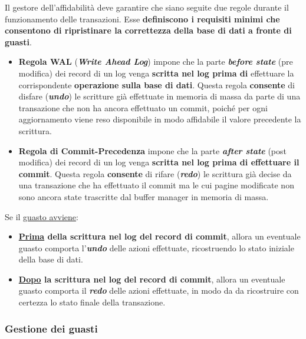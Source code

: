 \documentclass[a4paper]{article}
\begin{document}
	Il gestore dell'affidabilità deve garantire che siano seguite due regole durante il funzionamento delle transazioni. Esse \textbf{definiscono i requisiti minimi che consentono di ripristinare la correttezza della base di dati a fronte di guasti}.
	\begin{itemize}
		\item \textcolor{Red3}{\textbf{Regola WAL}} (\textbf{\emph{Write Ahead Log}}) impone che la parte \textbf{\emph{before state}} (pre modifica) dei record di un log venga \textbf{scritta nel log prima di} effettuare la corrispondente \textbf{operazione sulla base di dati}.\newline
		Questa regola \textbf{consente} di disfare (\textbf{\emph{undo}}) le scritture già effettuate in memoria di massa da parte di una transazione che non ha ancora effettuato un commit, poiché per ogni aggiornamento viene reso disponibile in modo affidabile il valore precedente la scrittura.
		
		\item \textcolor{Red3}{\textbf{Regola di Commit-Precedenza}} impone che la parte \textbf{\emph{after state}} (post modifica) dei record di un log venga \textbf{scritta nel log prima di effettuare il commit}.\newline
		Questa regola \textbf{consente} di rifare (\textbf{\emph{redo}}) le scrittura già decise da una transazione che ha effettuato il commit ma le cui pagine modificate non sono ancora state trascritte dal buffer manager in memoria di massa.
	\end{itemize}
	Se il \underline{guasto avviene}:
	\begin{itemize}
		\item \textbf{\underline{Prima} della scrittura nel log del record di commit}, allora un eventuale guasto comporta l'\textbf{\emph{undo}} delle azioni effettuate, ricostruendo lo stato iniziale della base di dati.
		
		\item \textbf{\underline{Dopo} la scrittura nel log del record di commit}, allora un eventuale guasto comporta il \textbf{\emph{redo}} delle azioni effettuate, in modo da da ricostruire con certezza lo stato finale della transazione.
	\end{itemize}\newpage
	
	\subsubsection{Gestione dei guasti}
	
\end{document}
